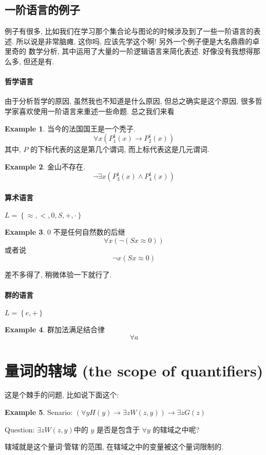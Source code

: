 \documentclass[a4paper, 12pt]{ctexbook} %
\theoremstyle{plain}
\theoremstyle{definition}
\newtheorem{example}{\llap{$\bigstar$}\space Example}
\theoremstyle{remark}
\begin{document}
\subsection{一阶语言的例子}
例子有很多, 比如我们在学习那个集合论与图论的时候涉及到了一些一阶语言的表述. 
所以说是非常脑瘫, 这你吗, 应该先学这个啊! 另外一个例子便是大名鼎鼎的卓里奇的
数学分析, 其中运用了大量的一阶逻辑语言来简化表述. 好像没有我想得那么多, 但还是有. 

\paragraph{哲学语言} %
\label{par:哲学语言}
由于分析哲学的原因, 虽然我也不知道是什么原因, 但总之确实是这个原因, 
很多哲学家喜欢使用一阶语言来重述一些命题. 总之我们来看 
\begin{example}
    当今的法国国王是一个秃子.
    \[
    \forall  x \left(P _{1} ^{1} \left(x\right) \to P_{2} ^{1} \left(x\right)\right)
    \]
    其中, $P$ 的下标代表的这是第几个谓词, 而上标代表这是几元谓词. 
\end{example}
\begin{example}
    金山不存在. 
    \[
    \neg \exists x \left( P ^{1} _{3} \left( x\right) \wedge P _{4} ^{1} \left( x\right) \right)
    \]
\end{example}

\paragraph{算术语言} %
\label{par:算术语言}
$L  =\left\{ \approx , < , 0  , S , + , \cdot\right\}$
\begin{example}
    $0$ 不是任何自然数的后继
    \[
    \forall  x \left( \neg \left( S x \approx 0\right)\right)
    \]
    或者说
    \[
    \neg x \left( S x \approx 0\right)
    \]
\end{example}
差不多得了, 稍微体验一下就行了. 

\paragraph{群的语言} %
\label{par:群的语言}
$L = \left\{e ,  + \right\}$
\begin{example}
    群加法满足结合律
    \[
    \forall  a 
    \]
\end{example}
\section{量词的辖域 (the scope of quantifiers)}
这是个棘手的问题, 比如说下面这个: 
\begin{example}
Senario: $ \left(\forall   y H \left( y\right) \to \exists z W \left(z,  y\right) \right) \to \exists z G \left(z\right)$

Question: $\exists z W \left(z,  y\right)$中的 $y$ 是否是包含于 $\forall y$ 的辖域之中呢? 
\end{example}
辖域就是这个量词`管辖'的范围, 在辖域之中的变量被这个量词限制的. 
\end{document}
